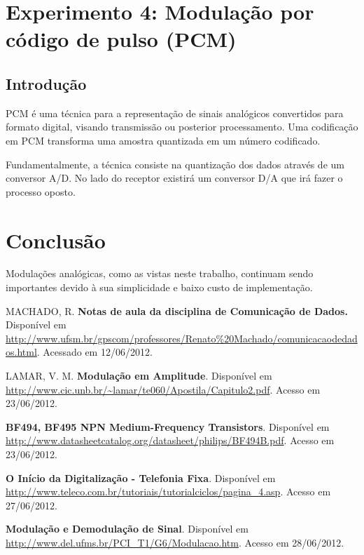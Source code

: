 \documentclass[]{report}
\begin{document}
\chapter{Experimento 4: Modulação por código de pulso (PCM)}
\section{Introdução}
PCM é uma técnica para a representação de sinais analógicos convertidos para formato digital, visando transmissão ou posterior processamento. Uma codificação em PCM transforma uma amostra quantizada em um número codificado. \cite{renatodatacom}

Fundamentalmente, a técnica consiste na quantização dos dados através de um conversor A/D. No lado do receptor existirá um conversor D/A que irá fazer o processo oposto.

\chapter{Conclusão}
Modulações analógicas, como as vistas neste trabalho, continuam sendo importantes devido à sua simplicidade e baixo custo de implementação. 


\begin{thebibliography}{100}
 MACHADO, R. 
 \textbf{Notas de aula da disciplina de Comunicação de Dados.}
 Disponível em \url{http://www.ufsm.br/gpscom/professores/Renato\%20Machado/comunicacaodedados.html}. Acessado em 12/06/2012.
 
LAMAR, V. M. \textbf{Modulação em Amplitude}. Disponível em \url{http://www.cic.unb.br/~lamar/te060/Apostila/Capitulo2.pdf}. Acesso em 23/06/2012.

 
\textbf{BF494, BF495 NPN Medium-Frequency Transistors}. Disponível em \url{http://www.datasheetcatalog.org/datasheet/philips/BF494B.pdf}. Acesso em 23/06/2012.

\textbf{O Início da Digitalização - Telefonia Fixa}. Disponível em \url{http://www.teleco.com.br/tutoriais/tutorialciclos/pagina_4.asp}. Acesso em 27/06/2012.

\textbf{Modulação e Demodulação de Sinal}. Disponível em \url{http://www.del.ufms.br/PCI_T1/G6/Modulacao.htm}. Acesso em 28/06/2012.
\end{thebibliography}
\end{document}
